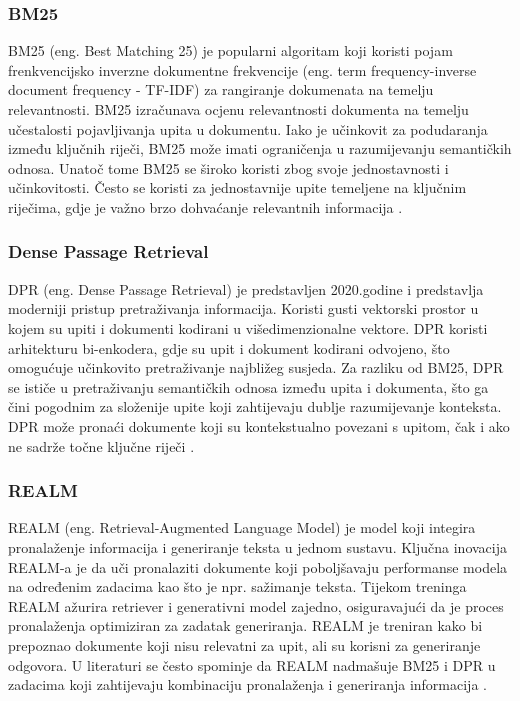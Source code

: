\documentclass[]{foi}
\begin{document}
\subsubsection{BM25}
BM25 (eng. Best Matching 25) je popularni algoritam koji koristi pojam frenkvencijsko inverzne dokumentne frekvencije (eng. term frequency-inverse document frequency - TF-IDF) za rangiranje dokumenata na temelju relevantnosti.
BM25 izračunava ocjenu relevantnosti dokumenta na temelju učestalosti pojavljivanja upita u dokumentu. Iako je učinkovit za podudaranja
između ključnih riječi, BM25 može imati ograničenja u razumijevanju semantičkih odnosa. Unatoč tome BM25 se široko koristi zbog svoje jednostavnosti
i učinkovitosti. Često se koristi za jednostavnije upite temeljene na ključnim riječima, gdje je važno brzo dohvaćanje relevantnih informacija \cite{gupta2024rag}.

\subsubsection{Dense Passage Retrieval}
DPR (eng. Dense Passage Retrieval) je predstavljen 2020.godine i predstavlja moderniji pristup pretraživanja informacija. Koristi gusti
vektorski prostor u kojem su upiti i dokumenti kodirani u višedimenzionalne vektore. DPR koristi arhitekturu bi-enkodera, gdje su upit 
i dokument kodirani odvojeno, što omogućuje učinkovito pretraživanje najbližeg susjeda. Za razliku od BM25, DPR se ističe u pretraživanju
semantičkih odnosa između upita i dokumenta, što ga čini pogodnim za složenije upite koji zahtijevaju dublje razumijevanje konteksta. DPR može
pronaći dokumente koji su kontekstualno povezani s upitom, čak i ako ne sadrže točne ključne riječi \cite{gupta2024rag}.

\subsubsection{REALM}
REALM (eng. Retrieval-Augmented Language Model) je model koji integira pronalaženje informacija i generiranje teksta u jednom sustavu.
Ključna inovacija REALM-a je da uči pronalaziti dokumente koji poboljšavaju performanse modela na određenim zadacima kao što je npr.
sažimanje teksta. Tijekom treninga REALM ažurira retriever i generativni model zajedno, osiguravajući da je proces pronalaženja optimiziran
za zadatak generiranja. REALM je treniran kako bi prepoznao dokumente koji nisu relevatni za upit, ali su korisni za generiranje odgovora.
U literaturi se često spominje da REALM nadmašuje BM25 i DPR u zadacima koji zahtijevaju kombinaciju pronalaženja i generiranja informacija \cite{gupta2024rag}.
\end{document}
